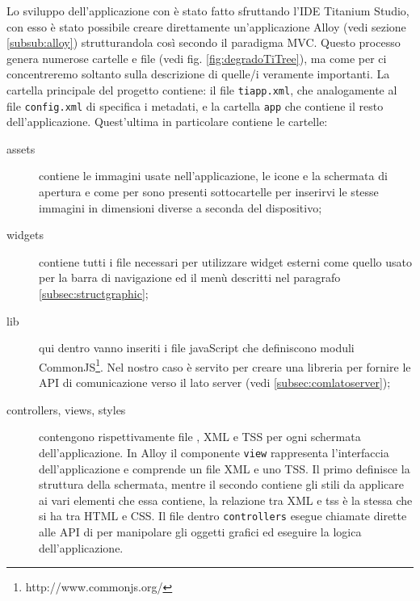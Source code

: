             Lo sviluppo dell'applicazione con \tisdk{} è stato fatto sfruttando
            l'IDE Titanium Studio, con esso è stato possibile creare direttamente
            un'applicazione Alloy (vedi sezione \ref{subsub:alloy}) strutturandola
            così secondo il paradigma MVC.
            Questo processo genera numerose cartelle e file (vedi fig. \ref{fig:degradoTiTree}),
            ma come per \pg{} ci concentreremo soltanto sulla descrizione di quelle/i veramente importanti.
            La cartella principale del progetto contiene: il file \texttt{tiapp.xml}, che
            analogamente al file \texttt{config.xml} di \pg{} specifica i metadati, e
            la cartella \texttt{app} che contiene il resto dell'applicazione.
            Quest'ultima in particolare contiene le cartelle:
            \begin{description}
                \item[assets] contiene le immagini usate nell'applicazione, le
                              icone e la schermata di apertura e come per \pg{}
                              sono presenti sottocartelle per inserirvi le stesse
                              immagini in dimensioni diverse a seconda del dispositivo;
                \item[widgets] contiene tutti i file necessari per utilizzare widget esterni
                               come quello usato per la barra di navigazione ed il menù descritti
                               nel paragrafo \ref{subsec:structgraphic};
                \item[lib] qui dentro vanno inseriti i file javaScript che definiscono
                           moduli CommonJS\footnote{http://www.commonjs.org/}. Nel
                           nostro caso è servito per creare una libreria per fornire
                           le API di comunicazione verso il lato server (vedi \ref{subsec:comlatoserver});
                \item[controllers, views, styles] contengono rispettivamente file
                            \js{}, XML e TSS per ogni schermata dell'applicazione.
                            In Alloy il componente \texttt{view} rappresenta l'interfaccia
                            dell'applicazione e comprende un file XML e uno TSS.
                            Il primo definisce la struttura della schermata, mentre il
                            secondo contiene gli stili da applicare ai vari elementi
                            che essa contiene, la relazione tra XML e tss è la stessa
                            che si ha tra HTML e CSS.
                            Il file dentro \texttt{controllers} esegue chiamate dirette
                            alle API di \tisdk{} per manipolare gli oggetti grafici
                            ed eseguire la logica dell'applicazione.
            \end{description}

